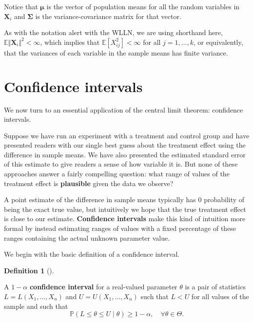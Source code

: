 \documentclass[
  13pt,
  letterpaper,
  DIV=11,
  numbers=noendperiod]{scrreprt}
\newcommand{\mb}{\symbf}
\newcommand{\E}{\mathbb{E}}
\renewcommand{\P}{\mathbb{P}}
\newcommand{\X}{\mb{X}}
\theoremstyle{definition}
\newtheorem{definition}{Definition}[chapter]
\theoremstyle{definition}
\theoremstyle{plain}
\theoremstyle{remark}
\begin{document}
Notice that \(\mb{\mu}\) is the vector of population means for all the
random variables in \(\X_i\) and \(\mb{\Sigma}\) is the
variance-covariance matrix for that vector.

\begin{tcolorbox}[enhanced jigsaw, leftrule=.75mm, colbacktitle=quarto-callout-note-color!10!white, title=\textcolor{quarto-callout-note-color}{\faInfo}\hspace{0.5em}{Note}, toptitle=1mm, breakable, left=2mm, toprule=.15mm, arc=.35mm, opacitybacktitle=0.6, opacityback=0, colback=white, rightrule=.15mm, titlerule=0mm, colframe=quarto-callout-note-color-frame, bottomtitle=1mm, bottomrule=.15mm, coltitle=black]

As with the notation alert with the WLLN, we are using shorthand here,
\(\E\Vert \mb{X}_i \Vert^2 < \infty\), which implies that
\(\E[X_{ij}^2] < \infty\) for all \(j = 1,\ldots, k\), or equivalently,
that the variances of each variable in the sample means has finite
variance.

\end{tcolorbox}

\section{Confidence intervals}\label{confidence-intervals}

We now turn to an essential application of the central limit theorem:
confidence intervals.

Suppose we have run an experiment with a treatment and control group and
have presented readers with our single best guess about the treatment
effect using the difference in sample means. We have also presented the
estimated standard error of this estimate to give readers a sense of how
variable it is. But none of these approaches answer a fairly compelling
question: what range of values of the treatment effect is
\textbf{plausible} given the data we observe?

A point estimate of the difference in sample means typically has 0
probability of being the exact true value, but intuitively we hope that
the true treatment effect is close to our estimate. \textbf{Confidence
intervals} make this kind of intuition more formal by instead estimating
ranges of values with a fixed percentage of these ranges containing the
actual unknown parameter value.

We begin with the basic definition of a confidence interval.

\begin{definition}[]\protect\hypertarget{def-coverage}{}\label{def-coverage}

A \(1-\alpha\) \textbf{confidence interval} for a real-valued parameter
\(\theta\) is a pair of statistics \(L= L(X_1, \ldots, X_n)\) and
\(U = U(X_1, \ldots, X_n)\) such that \(L < U\) for all values of the
sample and such that \[ 
\P(L \leq \theta \leq U \mid \theta) \geq 1-\alpha, \quad \forall \theta \in \Theta.
\]

\end{definition}
\end{document}
